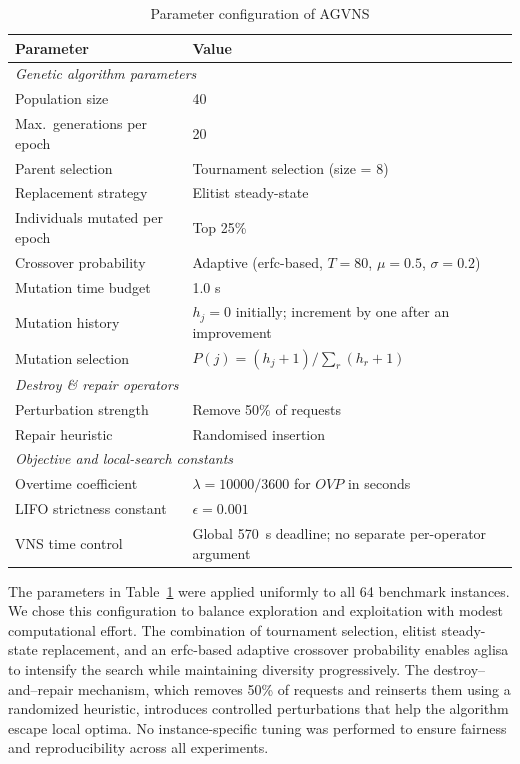 \documentclass[pdflatex]{sn-jnl}
\begin{document}
\begin{table}[htbp]
\centering
\caption{Parameter configuration of AGVNS}
\label{tab:parameters}
\begin{tabular}{l l}
\toprule
\textbf{Parameter} & \textbf{Value} \\
\midrule
\multicolumn{2}{l}{\textit{Genetic algorithm parameters}} \\
Population size & 40 \\
Max.\ generations per epoch & 20 \\
Parent selection & Tournament selection (size = 8) \\
Replacement strategy & Elitist steady-state \\
Individuals mutated per epoch & Top 25\% \\
Crossover probability & Adaptive (erfc-based, $T{=}80$, $\mu{=}0.5$, $\sigma{=}0.2$) \\
Mutation time budget & 1.0 s \\
Mutation history & $h_j=0$ initially; increment by one after an improvement \\
Mutation selection & $P(j)=(h_j+1)/\sum_r(h_r+1)$ \\
\midrule
\multicolumn{2}{l}{\textit{Destroy \& repair operators}} \\
Perturbation strength & Remove 50\% of requests \\
Repair heuristic & Randomised insertion \\
\midrule
\multicolumn{2}{l}{\textit{Objective and local-search constants}} \\
Overtime coefficient & $\lambda=10000/3600$ for $OVP$ in seconds \\
LIFO strictness constant & $\epsilon=0.001$ \\
VNS time control & Global 570~s deadline; no separate per-operator argument \\
\bottomrule
\end{tabular}
\end{table}

The parameters in Table~\ref{tab:parameters} were applied uniformly to all 64 benchmark instances. We chose this configuration to balance exploration and exploitation with modest computational effort. The combination of tournament selection, elitist steady-state replacement, and an erfc-based adaptive crossover probability enables \gls{aglisa} to intensify the search while maintaining diversity progressively. The destroy–and–repair mechanism, which removes 50\% of requests and reinserts them using a randomized heuristic, introduces controlled perturbations that help the algorithm escape local optima. No instance-specific tuning was performed to ensure fairness and reproducibility across all experiments.
\end{document}
